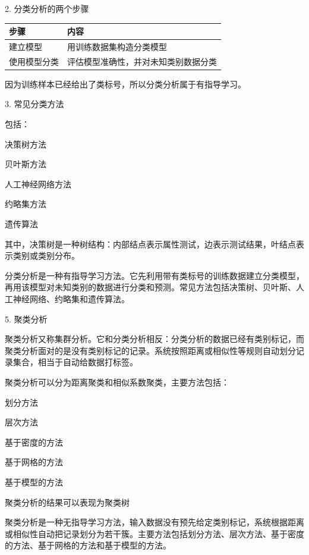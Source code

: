 \documentclass[UTF8,zihao=-4]{ctexart}
\begin{document}
2. 分类分析的两个步骤\par
\begin{tabularx}{\linewidth}{|*{2}{>{\RaggedRight\arraybackslash}X|}}
\hline
步骤 & 内容 \\
\hline
建立模型 & 用训练数据集构造分类模型 \\
\hline
使用模型分类 & 评估模型准确性，并对未知类别数据分类 \\
\hline
\end{tabularx}

因为训练样本已经给出了类标号，所以分类分析属于有指导学习。\par

3. 常见分类方法\par

包括：\par
决策树方法\par
贝叶斯方法\par
人工神经网络方法\par
约略集方法\par
遗传算法\par

其中，决策树是一种树结构：内部结点表示属性测试，边表示测试结果，叶结点表示类别或类别分布。\par

分类分析是一种有指导学习方法。它先利用带有类标号的训练数据建立分类模型，再用该模型对未知类别的数据进行分类和预测。常见方法包括决策树、贝叶斯、人工神经网络、约略集和遗传算法。\par

5. 聚类分析\par

聚类分析又称集群分析。它和分类分析相反：分类分析的数据已经有类别标记，而聚类分析面对的是没有类别标记的记录。系统按照距离或相似性等规则自动划分记录集合，相当于自动给数据打标签。\par

聚类分析可以分为距离聚类和相似系数聚类，主要方法包括：\par

划分方法\par
层次方法\par
基于密度的方法\par
基于网格的方法\par
基于模型的方法\par

聚类分析的结果可以表现为聚类树\par

聚类分析是一种无指导学习方法，输入数据没有预先给定类别标记，系统根据距离或相似性自动把记录划分为若干簇。主要方法包括划分方法、层次方法、基于密度的方法、基于网格的方法和基于模型的方法。\par
\end{document}
